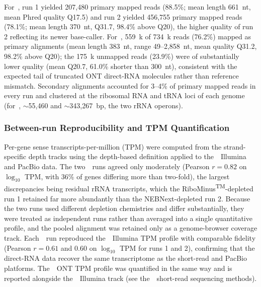 For~\syn, run 1 yielded 207{,}480 primary mapped reads (88.5\%; mean length 661~nt, mean Phred quality Q17.5) and run 2 yielded 456{,}755 primary mapped reads (78.1\%; mean length 370~nt, Q31.7, 98.4\% above Q20), the higher quality of run 2 reflecting its newer base-caller.
For~\syna, 559~k of 734~k reads (76.2\%) mapped as primary alignments (mean length 383~nt, range 49--2{,}858~nt, mean quality Q31.2, 98.2\% above Q20); the 175~k unmapped reads (23.9\%) were of substantially lower quality (mean Q20.7, 61.0\% shorter than 300~nt), consistent with the expected tail of truncated ONT direct-RNA molecules rather than reference mismatch.
Secondary alignments accounted for 3--4\% of primary mapped reads in every run and clustered at the ribosomal RNA and tRNA loci of each genome (for~\syna, $\sim$55{,}460 and $\sim$343{,}267~bp, the two rRNA operons).

\subsubsection{Between-run Reproducibility and TPM Quantification}

Per-gene sense transcripts-per-million (TPM) were computed from the strand-specific depth tracks using the depth-based definition applied to the~\syn~Illumina and PacBio data.
The two~\syn~runs agreed only moderately (Pearson $r = 0.82$ on $\log_{10}$ TPM, with 36\% of genes differing more than two-fold), the largest discrepancies being residual rRNA transcripts, which the RiboMinus\textsuperscript{TM}-depleted run 1 retained far more abundantly than the NEBNext\textregistered{}-depleted run 2.
Because the two runs used different depletion chemistries and differ substantially, they were treated as independent runs rather than averaged into a single quantitative profile, and the pooled alignment was retained only as a genome-browser coverage track.
Each~\syn~run reproduced the~\syn~Illumina TPM profile with comparable fidelity (Pearson $r = 0.61$ and $0.60$ on $\log_{10}$ TPM for runs 1 and 2), confirming that the direct-RNA data recover the same transcriptome as the short-read and PacBio platforms.
The~\syna~ONT TPM profile was quantified in the same way and is reported alongside the~\syna~Illumina track (see the~\syna~short-read sequencing methods).
